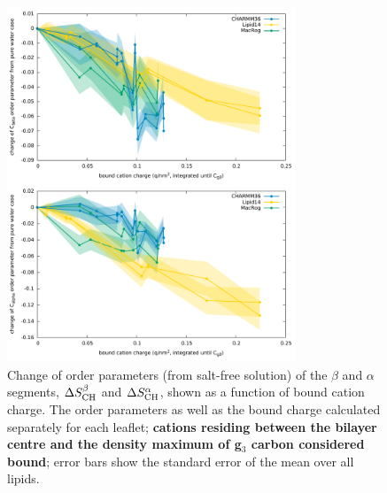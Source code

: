\documentclass[twoside,twocolumn,9pt]{article}
\begin{document}
\begin{figure}[t]
  \centering
  \includegraphics[width=8.6cm]{../scratch/boundIons/dOP_vs_boundCationCharge_g3.pdf}
  \caption{\label{electrometer_g3}
    Change of order parameters (from salt-free solution) of the $\beta$ and $\alpha$ segments,
    $\Delta S_{\rm{CH}}^{\beta}$ and $\Delta S_{\rm{CH}}^{\alpha}$,
    shown as a function of bound cation charge.
    The order parameters as well as the bound charge calculated separately for
    each leaflet; {\bf cations residing between the bilayer centre and the density maximum of g$_3$ carbon
    considered bound}; error bars show the standard error of the mean over all lipids.
   }
\end{figure}
\end{document}
